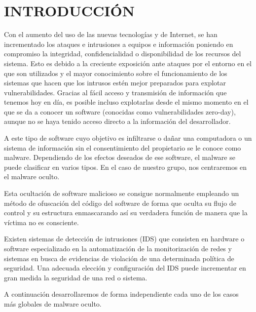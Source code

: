 \section{INTRODUCCIÓN}
	Con el aumento del uso de las nuevas tecnologías y de Internet, se han incrementado los ataques e intrusiones a equipos e información poniendo en compromiso la integridad, confidencialidad o disponibilidad de los recursos del sistema. Esto es debido a la creciente exposición ante ataques por el entorno en el que son utilizados y el mayor conocimiento sobre el funcionamiento de los sistemas que hacen que los intrusos estén mejor preparados para explotar vulnerabilidades. Gracias al fácil acceso y transmisión de información que tenemos hoy en día, es posible incluso explotarlas desde el mismo momento en el que se da a conocer un software (conocidas como vulnerabilidades zero-day), aunque no se haya tenido acceso directo a la información del desarrollador.

	A este tipo de software cuyo objetivo es infiltrarse o dañar una computadora o un sistema de información sin el consentimiento del propietario se le conoce como malware. Dependiendo de los efectos deseados de ese software, el malware se puede clasificar en varios tipos. En el caso de nuestro grupo, nos centraremos en el malware oculto.

	Esta ocultación de software malicioso se consigue normalmente empleando un método de ofuscación del código del software de forma que oculta su flujo de control y su estructura enmascarando así su verdadera función de manera que la víctima no es consciente.
	
	Existen sistemas de detección de intrusiones (IDS) que consisten en hardware o software especializado en la automatización de la monitorización de redes y sistemas en busca de evidencias de violación de una determinada política de seguridad. Una adecuada elección y configuración del IDS puede incrementar en gran medida la seguridad de una red o sistema.

	A continuación desarrollaremos de forma independiente cada uno de los casos más globales de malware oculto.